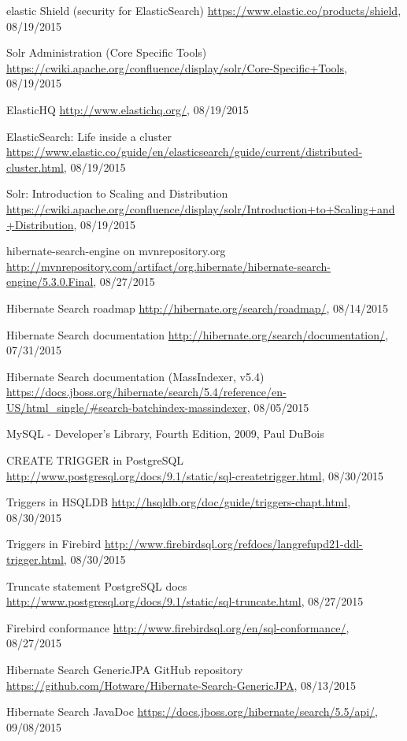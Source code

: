 \begin{thebibliography}{100}
	 elastic Shield (security for ElasticSearch)
	\url{https://www.elastic.co/products/shield}, 08/19/2015
	
	 Solr Administration (Core Specific Tools)
	\url{https://cwiki.apache.org/confluence/display/solr/Core-Specific+Tools}, 08/19/2015
	
	 ElasticHQ
	\url{http://www.elastichq.org/}, 08/19/2015
	
	 ElasticSearch: Life inside a cluster
	\url{https://www.elastic.co/guide/en/elasticsearch/guide/current/distributed-cluster.html}, 08/19/2015
	
	 Solr: Introduction to Scaling and Distribution
	\url{https://cwiki.apache.org/confluence/display/solr/Introduction+to+Scaling+and+Distribution}, 08/19/2015
	
	 hibernate-search-engine on mvnrepository.org
	\url{http://mvnrepository.com/artifact/org.hibernate/hibernate-search-engine/5.3.0.Final}, 08/27/2015
	
	 Hibernate Search roadmap
	\url{http://hibernate.org/search/roadmap/}, 08/14/2015
	
	 Hibernate Search documentation
	\url{http://hibernate.org/search/documentation/}, 07/31/2015
	
	 Hibernate Search documentation (MassIndexer, v5.4)
	\url{https://docs.jboss.org/hibernate/search/5.4/reference/en-US/html_single/#search-batchindex-massindexer}, 08/05/2015
	
	 MySQL - Developer's Library, Fourth Edition, 2009, Paul DuBois
	
	 CREATE TRIGGER in PostgreSQL
	\url{http://www.postgresql.org/docs/9.1/static/sql-createtrigger.html}, 08/30/2015
	
	 Triggers in HSQLDB
	\url{http://hsqldb.org/doc/guide/triggers-chapt.html}, 08/30/2015
	
	 Triggers in Firebird
	\url{http://www.firebirdsql.org/refdocs/langrefupd21-ddl-trigger.html}, 08/30/2015
	
	 Truncate statement PostgreSQL docs
	\url{http://www.postgresql.org/docs/9.1/static/sql-truncate.html}, 08/27/2015
	
	 Firebird conformance
	\url{http://www.firebirdsql.org/en/sql-conformance/}, 08/27/2015
	
	 Hibernate Search GenericJPA GitHub repository
	\url{https://github.com/Hotware/Hibernate-Search-GenericJPA}, 08/13/2015
	
	 Hibernate Search JavaDoc
	\url{https://docs.jboss.org/hibernate/search/5.5/api/}, 09/08/2015
	
	
\end{thebibliography}

\pagebreak
~
